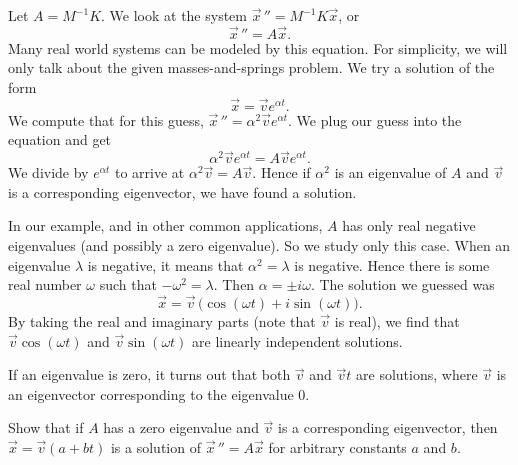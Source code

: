 \documentclass[12pt]{book}
\begin{document}
\medskip

Let $A = M^{-1}K$.  We look at the system
${\vec{x}\,}'' = M^{-1}K \vec{x}$, or
\begin{equation*}
{\vec{x}\,}'' = A \vec{x} .
\end{equation*}
Many real world systems can be modeled by this equation.  For simplicity,
we will only talk about the
given masses-and-springs problem.  We try a solution of the form
\begin{equation*}
\vec{x} = \vec{v} e^{\alpha t} .
\end{equation*}
We compute that for this guess,
${\vec{x}\,}'' = \alpha^2 \vec{v} e^{\alpha t}$.
We plug our guess into the equation and get
\begin{equation*}
\alpha^2 \vec{v} e^{\alpha t} = A\vec{v} e^{\alpha t} .
\end{equation*}
We divide by $e^{\alpha t}$ to arrive at
$\alpha^2 \vec{v} = A\vec{v}$.  Hence if $\alpha^2$ is an eigenvalue
of $A$ and $\vec{v}$ is a corresponding eigenvector, we have found
a solution.

In our example, and in other common applications,
$A$ has only real negative
eigenvalues (and possibly a zero eigenvalue).  So we study only this
case.  When an eigenvalue $\lambda$ is negative, it means that
$\alpha^2 = \lambda$ is negative.  Hence there is some real number $\omega$
such that $-\omega^2 = \lambda$.  Then $\alpha = \pm i \omega$.
The solution we guessed was
\begin{equation*}
\vec{x} = \vec{v} \, \bigl(\cos (\omega t) + i \sin (\omega t) \bigr) .
\end{equation*}
By taking the real and imaginary parts (note that $\vec{v}$ is real), we
find that 
$\vec{v} \cos (\omega t)$ and
$\vec{v} \sin (\omega t)$ are linearly independent solutions.

If an eigenvalue is zero, it turns out that both $\vec{v}$ and $\vec{v} t$ are
solutions, where $\vec{v}$ is an eigenvector corresponding to the eigenvalue
0.

\begin{exercise}
Show that if $A$ has a zero eigenvalue and $\vec{v}$ is a
corresponding eigenvector, then $\vec{x} = \vec{v} (a + bt)$ is a solution
of ${\vec{x}\,}'' = A \vec{x}$ for
arbitrary constants $a$ and $b$.
\end{exercise}
\end{document}
